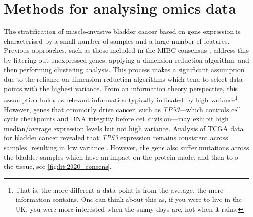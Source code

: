 
\section{Methods for analysing omics data} \label{s:lit:multi-omics}

\vspace{3mm}
\vspace{3mm}



The stratification of muscle-invasive bladder cancer based on gene expression is characterised by a small number of samples and a large number of features. Previous approaches, such as those included in the MIBC consensus \citep{Kamoun2020-tj}, address this by filtering out unexpressed genes, applying a dimension reduction algorithm, and then performing clustering analysis. This process makes a significant assumption due to the reliance on dimension reduction algorithms which tend to select data points with the highest variance. From an information theory perspective, this assumption holds as relevant information typically indicated by high variance\footnote{That is, the more different a data point is from the average, the more information contains. One can think about this as, if you were to live in the UK, you were more interested when the sunny days are, not when it rains.}. However, genes that commonly drive cancer, such as \textit{TP53}—which controls cell cycle checkpoints and DNA integrity before cell division—may exhibit high median/average expression levels but not high variance. Analysis of TCGA data for bladder cancer revealed that \textit{TP53} expression remains consistent across samples, resulting in low variance \citep{Robertson2017-mg}. However, the gene also suffer mutations across the bladder samples which have an impact on the protein made, and then to o the tissue, see \cref{fig:lit:2020_consens}.


